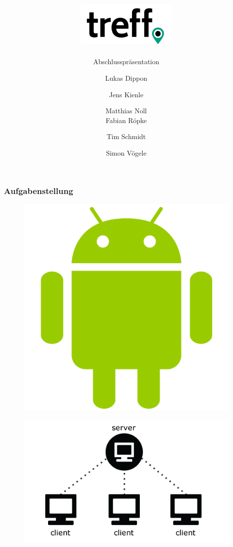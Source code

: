 \documentclass[aspectratio=1610]{beamer}
\title{\includegraphics[width = 50mm]{images/logo_crop.png}}
\subtitle{\huge Abschlusspräsentation}
\author{Lukas Dippon
	\and Jens Kienle
	\and Matthias Noll
    \\Fabian Röpke
	\and Tim Schmidt
	\and Simon Vögele}
\begin{document}
	\begin{frame}[plain]
	\maketitle
	\end{frame}

    \begin{frame}[plain]
        \frametitle{\textbf{Aufgabenstellung}}
        \begin{minipage}{0.5\textwidth}
            \begin{figure}
                \includegraphics[width = \columnwidth - 30pt]
                {images/android.png}
            \end{figure}
        \end{minipage}%
        \begin{minipage}{0.5\textwidth}
            \begin{figure}
                \includegraphics[width = \columnwidth - 30pt]
                {images/server-client.png}
            \end{figure}
        \end{minipage}
    \end{frame}
\end{document}
